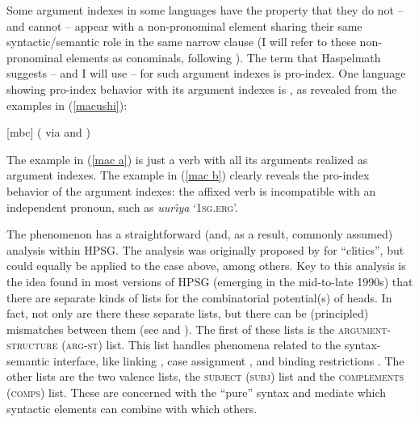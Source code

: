 \documentclass[output=paper
	        ,collection
	        ,collectionchapter
 	        ,biblatex
                ,babelshorthands
                ,newtxmath
                ,draftmode
                ,colorlinks, citecolor=brown
]{langscibook}
\begin{document}
Some argument indexes in some languages have the property that they do not -- and cannot -- appear with a non-pronominal element sharing their same syntactic/semantic role in the same narrow clause (I will refer to these non-pronominal elements as conominals, following \citealt{haspelmath13}). The term that Haspelmath suggests -- and I will use -- for such argument indexes is pro-index. One language showing pro-index behavior with its argument indexes is , as revealed from the examples in (\ref{macushi}): 
%
\begin{samepage}
\begin{exe}
\ex \label{macushi}  [mbc] (\citealt{abbott91} via \citealt{siewierska99} and \citealt{corbett03}) \nolistbreak
\begin{xlist}
\end{xlist}
\end{exe}
\end{samepage}
The example in (\ref{mac a}) is just a verb with all its arguments realized as argument indexes. The example in (\ref{mac b}) clearly reveals the pro-index behavior of the argument indexes: the affixed verb is incompatible with an independent pronoun, such as \textit{uur\^{\i}ya} `\textsc{1sg.erg}'. 

The  phenomenon has a straightforward (and, as a result, commonly assumed) analysis within HPSG. The analysis was originally proposed by \citet{MS97a-u} for  ``clitics'', but could equally be applied to the  case above, among others. Key to this analysis is the idea found in most versions of HPSG (emerging in the mid-to-late 1990s) that there are separate kinds of lists for the combinatorial potential(s) of heads. In fact, not only are there these separate lists, but there can be (principled) mismatches between them (see  and ). The first of these lists is the \textsc{argument-structure} (\textsc{arg-st}) list. This list handles phenomena related to the syntax-semantic interface, like linking \citep{Davis2001a-u}, case assignment \citep{Prze99b}, and binding restrictions \citep{mannsag98,wecharka98}. The other lists are the two valence lists, the \textsc{subject} (\textsc{subj}) list and the \textsc{complements} (\textsc{comps}) list. These are concerned with the ``pure'' syntax and mediate which syntactic elements can combine with which others.
\end{document}
